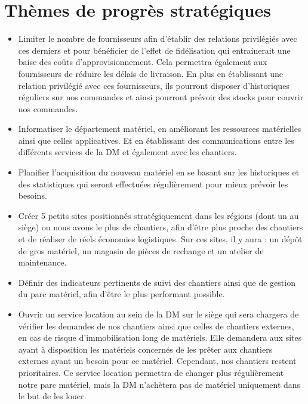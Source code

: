 \section{Thèmes de progrès stratégiques}
        \begin{itemize}
                \item Limiter le nombre de fournisseurs afin d'établir des relations privilégiés avec ces derniers et pour bénéficier de l'effet de fidélisation qui entrainerait une baise des coûts d'approvisionnement. Cela permettra également aux fournisseurs de réduire les délais de livraison. En plus en établissant une relation privilégié avec ces fournisseurs, ils pourront disposer d'historiques réguliers sur nos commandes et ainsi pourront prévoir des stocks pour couvrir nos commandes.
                \item Informatiser le département matériel, en améliorant les ressources matérielles ainsi que celles applicatives. Et en établissant des communications entre les différents services de la DM et également avec les chantiers.
                \item Planifier l'acquisition du nouveau matériel en se basant sur les historiques et des statistiques qui seront effectuées régulièrement pour mieux prévoir les besoins.
                \item Créer 5 petits sites positionnés stratégiquement dans les régions (dont un au siège) ou nous avons le plus de chantiers, afin d'être plus proche des chantiers et de réaliser de réels économies logistiques. Sur ces sites, il y aura : un dépôt de gros matériel, un magasin de pièces de rechange et un atelier de maintenance.
                \item Définir des indicateurs pertinents de suivi des chantiers ainsi que de gestion du parc matériel, afin d'être le plus performant possible.
                \item Ouvrir un service location au sein de la DM sur le siège qui sera chargera de vérifier les demandes de nos chantiers ainsi que celles de chantiers externes, en cas de risque d'immobilisation long de matériels. Elle demandera aux sites ayant à disposition les matériels concernés de les prêter aux chantiers externes ayant un besoin pour ce matériel. Cependant, nos chantiers restent prioritaires. Ce service location permettra de changer plus régulièrement notre parc matériel, mais la DM n'achètera pas de matériel uniquement dans le but de les louer.
        \end{itemize}

